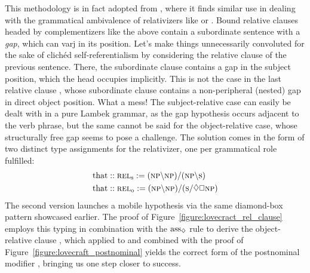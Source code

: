 This methodology is in fact adopted from \citet{moortgat1999constants}, where it finds similar use in dealing with the grammatical ambivalence of relativizers like  or .
Bound relative clauses headed by complementizers like the above contain a subordinate sentence with a \textit{gap}, which can varj in its position.
Let's make things unnecessarily convoluted for the sake of clich{\'e}d self-referentialism by considering the relative clause  of the previous sentence.
There, the subordinate clause  contains a gap in the subject position, which the head  occupies implicitly.
This is not the case in the last relative clause , whose subordinate clause  contains a non-peripheral (nested) gap in direct object position.
What a mess! 
The subject-relative case can easily be dealt with in a pure Lambek grammar, as the gap hypothesis occurs adjacent to the verb phrase, but
the same cannot be said for the object-relative case, whose structurally free gap seems to pose a challenge.
The solution comes in the form of two distinct type assignments for the relativizer, one per grammatical role fulfilled:
\begin{align}
	\w{that} &:: \subcat{l}{rel}{s} := (\np\divleft\np)\divright(\np\divleft\s)\\
	\w{that} &:: \subcat{l}{rel}{o} := (\np\divleft\np)\divright(\s\divright\diamond\Box \np ) \label{equation:objrel}
\end{align}
The second version launches a mobile \np[s] hypothesis via the same diamond-box pattern showcased earlier.
The proof of Figure~\ref{figure:lovecract_rel_clause} employs this typing in combination with the $\rulestyle{ass}_{\diamond}$ rule to derive the object-relative clause , which applied to  and combined with the proof of Figure~\ref{figure:lovecraft_postnominal} yields the correct form of the postnominal modifier , bringing us one step closer to success.

